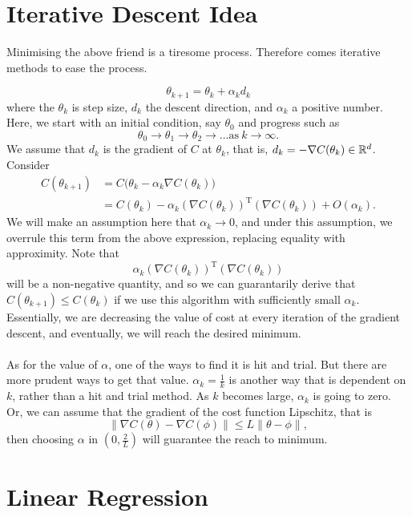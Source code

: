 \section{Iterative Descent Idea}
Minimising the above friend is a tiresome process. Therefore comes iterative methods to ease the process.

$$\theta_{k+1} = \theta_k + \alpha_k d_k$$
where the $\theta_k$ is step size, $d_k$ the descent direction, and $\alpha_k$ a positive number. Here, we start with an initial condition, say $\theta_0$ and progress such as
$$\theta_0 \to \theta_1 \to \theta_2 \to \dots \mathrm{as}\ k \to \infty.$$
We assume that $d_k$ is the gradient of $C$ at $\theta_k$, that is, $d_k = -\nabla C(\theta_k) \in \mathbb{R}^d$.
Consider
\begin{align*}
	C(\theta_{k+1}) &= C\big(\theta_k - \alpha_k \nabla C(\theta_k)\big) \\
	&=C(\theta_k) - \alpha_k\left( \nabla C(\theta_k) \right)^{\mathrm{T}}\left(\nabla C(\theta_k)\right) + O(\alpha_k).
\end{align*}
We will make an assumption here that $\alpha_k\to0$, and under this assumption, we overrule this term from the above expression, replacing equality with approximity. Note that
$$\alpha_k\left( \nabla C(\theta_k) \right)^{\mathrm{T}}\left(\nabla C(\theta_k)\right)$$
will be a non-negative quantity, and so we can guarantarily derive that $C(\theta_{k+1}) \le C(\theta_k)$ if we use this algorithm with sufficiently small $\alpha_k$. Essentially, we are decreasing the value of cost at every iteration of the gradient descent, and eventually, we will reach the desired minimum.

\paragraph{}
As for the value of $\alpha$, one of the ways to find it is hit and trial. But there are more prudent ways to get that value. $\alpha_k = \frac1k$ is another way that is dependent on $k$, rather than a hit and trial method. As $k$ becomes large, $\alpha_k$ is going to zero. Or, we can assume that the gradient of the cost function Lipschitz, that is
$$\|\nabla C(\theta) - \nabla C(\phi) \| \le L \| \theta - \phi \|,$$
then choosing $\alpha$ in $\left(0, \frac2{L}\right)$ will guarantee the reach to minimum.

\section{Linear Regression}

